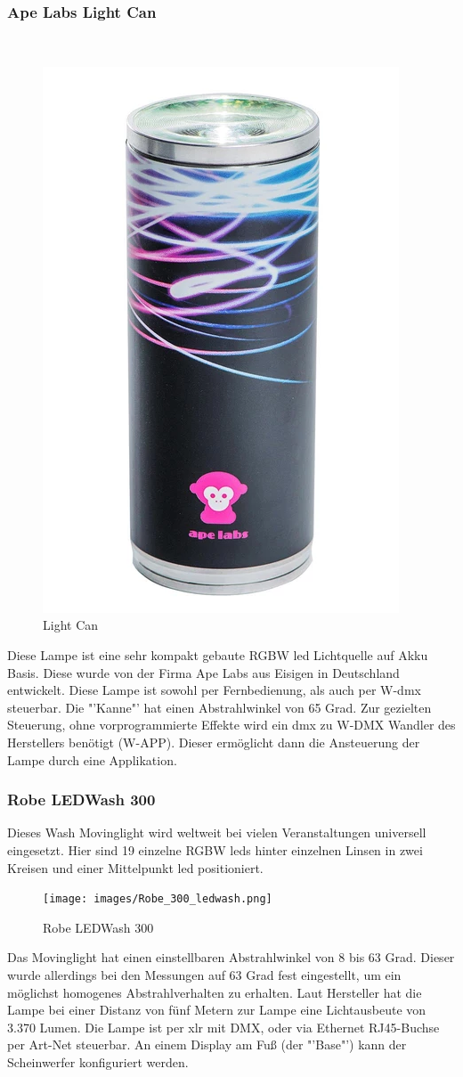 \documentclass[11pt]{scrartcl}
\begin{document}
\subsubsection{Ape Labs Light Can}
~\par\vspace{-\baselineskip}
\begin{figure}
    \vspace{-45pt}
    \begin{center}
        \includegraphics[width=.23\textwidth]{images/light_can_front.png}
    \end{center}
    \vspace{-20pt}
    \begin{center}
        \caption{Light Can\\\cite{lightCan}}
    \end{center}
    \vspace{-15pt}
\end{figure}
\noindent
Diese Lampe ist eine sehr kompakt gebaute RGBW \ac{led} Lichtquelle auf Akku Basis. Diese wurde von der Firma Ape Labs aus Eisigen in Deutschland
entwickelt. Diese Lampe ist sowohl per Fernbedienung, als auch per W-\ac{dmx} steuerbar.
Die "'Kanne"' hat einen Abstrahlwinkel von 65 Grad. Zur gezielten Steuerung, ohne vorprogrammierte Effekte wird ein \ac{dmx} zu W-DMX Wandler des Herstellers benötigt (W-APP). Dieser ermöglicht dann die Ansteuerung der Lampe durch eine Applikation.
\subsubsection{Robe LEDWash 300}
Dieses Wash Movinglight wird weltweit bei vielen Veranstaltungen universell eingesetzt. Hier sind 19 einzelne
RGBW \ac{led}s hinter einzelnen Linsen in zwei Kreisen und einer Mittelpunkt \ac{led} positioniert.
\begin{figure}[H]
    \begin{center}
        \texttt{[image: images/Robe\_300\_ledwash.png]}
    \end{center}
    \caption{Robe LEDWash 300 \cite{robe}}
\end{figure}
\noindent
Das Movinglight hat einen einstellbaren Abstrahlwinkel von 8 bis 63 Grad. Dieser wurde allerdings bei den Messungen auf 63 Grad fest eingestellt,
um ein möglichst homogenes Abstrahlverhalten zu erhalten. Laut Hersteller hat die Lampe bei einer Distanz von fünf Metern zur Lampe eine
Lichtausbeute von 3.370 Lumen. Die Lampe ist per \ac{xlr} mit DMX, oder via Ethernet RJ45-Buchse per Art-Net steuerbar. An einem Display
am Fuß (der "'Base"') kann der Scheinwerfer konfiguriert werden.
\end{document}

